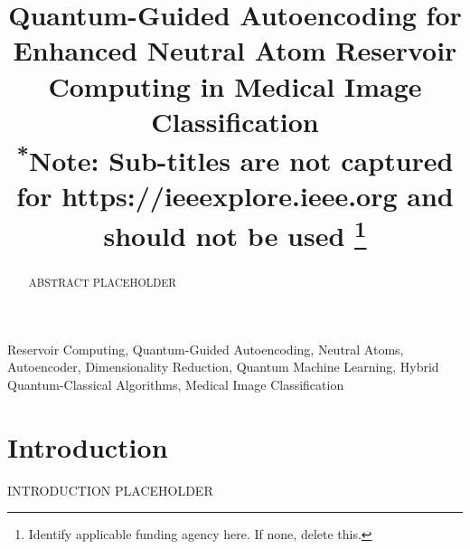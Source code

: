 \documentclass[conference]{IEEEtran}
\begin{document}
\title{Quantum-Guided Autoencoding for Enhanced Neutral Atom Reservoir Computing in Medical Image Classification\\
{\footnotesize \textsuperscript{*}Note: Sub-titles are not captured for https://ieeexplore.ieee.org  and
should not be used}
\thanks{Identify applicable funding agency here. If none, delete this.}
}

\author{

\and
{}
}

\maketitle


\begin{abstract}

ABSTRACT PLACEHOLDER 

\end{abstract}


\begin{IEEEkeywords}

Reservoir Computing, Quantum-Guided Autoencoding,
Neutral Atoms, Autoencoder, Dimensionality Reduction, 
Quantum Machine Learning, Hybrid Quantum-Classical Algorithms, 
Medical Image Classification

\end{IEEEkeywords}


\section{Introduction}

INTRODUCTION PLACEHOLDER
\end{document}
